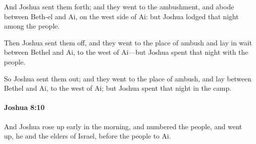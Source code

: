 			\begin{versebox}
					\item[BHS] 
					\item[ASV] And Joshua sent them forth; and they went to the ambushment, and abode between Beth-el and Ai, on the west side of Ai: but Joshua lodged that night among the people.
					\item[NIV] Then Joshua sent them off, and they went to the place of ambush and lay in wait between Bethel and Ai, to the west of Ai—but Joshua spent that night with the people.
					\item[NRSV] So Joshua sent them out; and they went to the place of ambush, and lay between Bethel and Ai, to the west of Ai; but Joshua spent that night in the camp.
			\end{versebox}

		\paragraph{Joshua 8:10} %
			\label{JOSHUA-8-10}

			And Joshua rose up early in the morning, and numbered the people, and went up, he and the elders of Israel, before the people to Ai.

